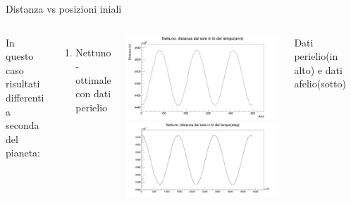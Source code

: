         \begin{frame}{Distanza vs posizioni iniali}
            \begin{columns}
                    In questo caso risultati differenti a seconda del pianeta:
                    \begin{enumerate}
                        \item Nettuno - ottimale con dati perielio
                    \end{enumerate}
                    \centering
                    \includegraphics[width=\textwidth]{5_distanza/Net_epri_500.jpg}
                    \includegraphics[width=\textwidth]{5_distanza/net_afe_500.jpg}
                    \caption{Dati perielio(in alto) e dati afelio(sotto)}
                    \label{cfr::net} 
            \end{columns}
        \end{frame}
